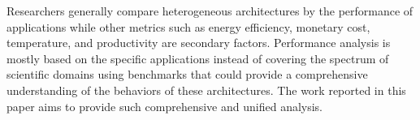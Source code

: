 Researchers generally compare heterogeneous architectures by the performance of 
applications while other metrics such as energy efficiency, 
monetary cost, temperature, and productivity are secondary factors. %
Performance analysis is mostly based on the specific applications instead of covering the spectrum of scientific domains using benchmarks
that could provide a comprehensive understanding of the behaviors of these architectures. 
The work reported in this paper aims to provide such comprehensive and unified analysis. 


